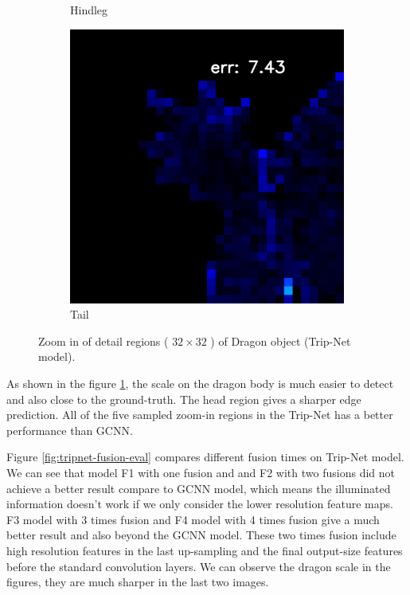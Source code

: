 \begin{figure}[H]
\begin{subfigure}[b]{0.18\linewidth}
		\caption{Hindleg}
	\end{subfigure}
	\begin{subfigure}[b]{0.18\linewidth}
		\includegraphics[width=\linewidth]{./Figures/trip_net_zoom_in/eval_7_12_-48_error.png}
		\caption{Tail}
	\end{subfigure}
	
	\decoRule
	\caption{Zoom in of detail regions ( $ 32\times32 $ ) of Dragon object (Trip-Net model).}
	\label{fig:tripnet-eval-synthetic-zoom-in}
\end{figure}


As shown in the figure \ref{fig:tripnet-eval-synthetic-zoom-in}, the scale on the dragon body is much easier to detect and also close to the ground-truth. The head region gives a sharper edge prediction. All of the five sampled zoom-in regions in the Trip-Net has a better performance than GCNN. 


Figure \ref{fig:tripnet-fusion-eval} compares different fusion times on Trip-Net model. We can see that model F1 with one fusion and and F2 with two fusions did not achieve a better result compare to GCNN model, which means the illuminated information doesn't work if we only consider the lower resolution feature maps. F3 model with 3 times fusion and F4 model with 4 times fusion give a much better result and also beyond the GCNN model. These two times fusion include high resolution features in the last up-sampling and the final output-size features before the standard convolution layers. We can observe the dragon scale in the figures, they are much sharper in the last two images.



